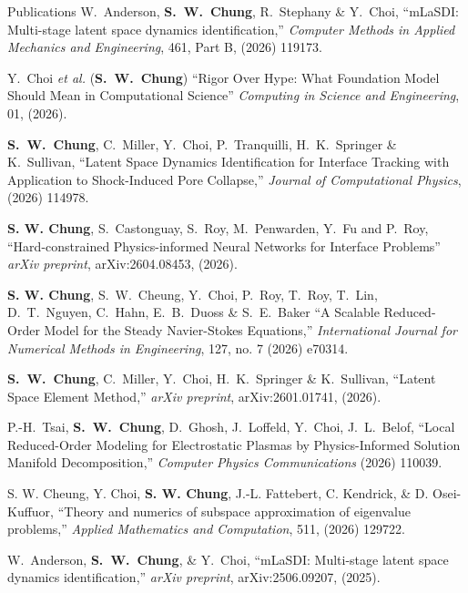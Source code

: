 \documentclass{resume} %
\begin{document}

\begin{rSection}{Publications}
W.\ Anderson, \textbf{S.\ W.\ Chung}, R.\ Stephany \& Y.\ Choi,
``mLaSDI: Multi-stage latent space dynamics identification,'' 
\textit{Computer Methods in Applied Mechanics and Engineering}, 461, Part B, (2026) 119173.
\par
Y.\ Choi \textit{et al.} (\textbf{S.\ W.\ Chung})
``Rigor Over Hype: What Foundation Model Should Mean in Computational Science''
\textit{Computing in Science and Engineering}, 01, (2026).
\par
\textbf{S.\ W.\ Chung}, C.\ Miller, Y.\ Choi, P.\ Tranquilli, H.\ K.\ Springer \& K.\ Sullivan,
``Latent Space Dynamics Identification for Interface Tracking with Application to Shock-Induced Pore Collapse,''
\textit{Journal of Computational Physics}, (2026) 114978.
\par
\textbf{S. W. Chung}, S.\ Castonguay, S.\ Roy, M.\ Penwarden, Y.\ Fu and P.\ Roy,
``Hard-constrained Physics-informed Neural Networks for Interface Problems''
\textit{arXiv preprint}, arXiv:2604.08453, (2026).
\par
\textbf{S. W. Chung}, S.\ W.\ Cheung, Y.\ Choi, P.\ Roy, T.\ Roy, T.\ Lin, D.\ T.\ Nguyen, C.\ Hahn, E.\ B.\ Duoss \& S.\ E.\ Baker
``A Scalable Reduced-Order Model for the Steady Navier-Stokes Equations,''
\textit{International Journal for Numerical Methods in Engineering}, 127, no. 7 (2026) e70314.
\par
\textbf{S.\ W.\ Chung}, C.\ Miller, Y.\ Choi, H.\ K.\ Springer \& K.\ Sullivan,
``Latent Space Element Method,''
\textit{arXiv preprint}, arXiv:2601.01741, (2026).
\par
P.-H.\ Tsai, \textbf{S.\ W.\ Chung}, D.\ Ghosh, J.\ Loffeld, Y.\ Choi, J.\ L.\ Belof,
``Local Reduced-Order Modeling for Electrostatic Plasmas by Physics-Informed Solution Manifold Decomposition,''
\textit{Computer Physics Communications} (2026) 110039.
\par
S. W. Cheung, Y. Choi, \textbf{S. W. Chung}, J.-L. Fattebert, C. Kendrick, \& D. Osei-Kuffuor,
``Theory and numerics of subspace approximation of eigenvalue problems,''
\textit{Applied Mathematics and Computation}, 511, (2026) 129722.
\par
W.\ Anderson, \textbf{S.\ W.\ Chung}, \& Y.\ Choi,
``mLaSDI: Multi-stage latent space dynamics identification,'' 
\textit{arXiv preprint}, arXiv:2506.09207, (2025).

\end{rSection}
\end{document}
